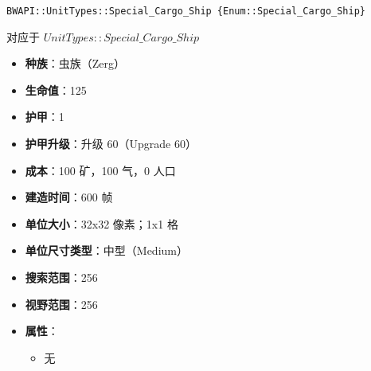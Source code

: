 \begin{tcolorbox}[colback=white, colframe=black!60!white, title=Special\_Cargo\_Ship(), arc=0mm]
    \begin{verbatim}
BWAPI::UnitTypes::Special_Cargo_Ship {Enum::Special_Cargo_Ship}
    \end{verbatim}
    对应于  $UnitTypes::Special\_Cargo\_Ship$ 
    \begin{itemize}
        \item \textbf{种族}：虫族（Zerg）
        \item \textbf{生命值}：125
        \item \textbf{护甲}：1
        \item \textbf{护甲升级}：升级 60（Upgrade 60）
        \item \textbf{成本}：100 矿，100 气，0 人口
        \item \textbf{建造时间}：600 帧
        \item \textbf{单位大小}：32x32 像素；1x1 格
        \item \textbf{单位尺寸类型}：中型（Medium）
        \item \textbf{搜索范围}：256
        \item \textbf{视野范围}：256
        \item \textbf{属性}：
            \begin{itemize}
                \item 无
            \end{itemize}
    \end{itemize}
\end{tcolorbox}

